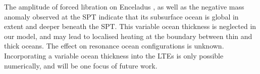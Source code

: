 The amplitude of forced libration on Enceladus \citep{thomas2016enceladus}, as well as the negative mass anomaly observed at the SPT \citep{iess2014gravity, mckinnon2015effect} indicate that its subsurface ocean is global in extent and deeper beneath the SPT. This variable ocean thickness is neglected in our model, and may lead to localised heating at the boundary between thin and thick oceans. The effect on resonance ocean configurations is unknown. Incorporating a variable ocean thickness into the LTEs is only possible numerically, and will be one focus of future work.


